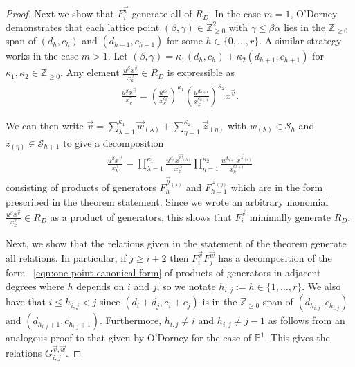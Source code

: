 \documentclass{amsart}
\theoremstyle{plain}
\theoremstyle{definition}
\theoremstyle{remark}
\numberwithin{equation}{section}
\newcommand\bp{{\mathbb P}}
\newcommand\bz{{\mathbb Z}}
\newcommand\mss{\mathscr{S}}
\begin{document}
\begin{proof}
Next we show that $F^{\vec v}_i$ generate all of $R_D$. In the case $m = 1$, O'Dorney \cite[Theorem 6]
{dorney:canonical} demonstrates that each lattice point $(\beta, \gamma) \in
\bz_{\geq 0}^2$ with $\gamma \leq \beta \alpha$ lies in the $\bz_{\geq 0}$ span
of $(d_h, c_h)$ and $(d_{h + 1}, c_{h + 1})$ for
some $h \in \{0, \ldots, r\}$. A similar strategy works in the case $m > 1$. Let $(\beta, \gamma) = \kappa_1
(d_h, c_h) + \kappa_2 (d_{h + 1}, c_{h + 1})$ for $\kappa_1, \kappa_2 \in
\bz_{\geq 0}$. Any element $\frac{u^{\beta}
x^{\vec{v}}} {x_k^{ \gamma}} \in R_D$ is expressible as
\begin{align*}
	\frac{u^{\beta} x^{\vec{v}}} {x_k^{\gamma}} = \left(\frac{u^{d_h}}
	{x_k^{c_h}}\right)^{\kappa_1} \left(\frac{u^{d_{h + 1}}}
	{x_k^{c_{h + 1}}}\right)^{\kappa_2} x^{\vec{v}}.
\end{align*}

\noindent
We can then write $\vec{v}  = \sum_{\lambda=1}^{\kappa_1}\vec{w}_{(\lambda)} +
\sum_{\eta=1}^{\kappa_2} \vec z_{(\eta)}$ with $w_{(\lambda)} \in \mss_h$ and
$z_{(\eta)} \in \mss_{h+1}$ to give a decomposition
\begin{align}
\label{eqn:one-point-canonical-form}
	\frac{u^{\beta} x^{\vec{v}}} {x_k^{\gamma}}	= \prod_{\lambda = 1}
	^{\kappa_1} \frac{u^{d_h} x^{\vec{w}_{(\lambda)}}} {x_k^{c_h}}
	\prod_{\eta = 1}^{\kappa_2} \frac{u^{d_{h + 1}} x^{\vec{z}_{(\eta)}}}
	{x_k^{c_{h + 1}}}
\end{align}
\noindent
consisting of products of generators $F_h^{\vec{y}_{(\lambda)}}$
and $F_{h + 1}^{\vec{z}_{(\eta)}}$ which are in the form
prescribed in the theorem statement. Since we wrote an arbitrary monomial
$\frac{u^{\beta} x^{\vec{v}}}{x_k^\gamma} \in R_D$ as a product of generators,
this shows that $F_i^{\vec v}$ minimally generate $R_D$.

Next, we show that the relations given in the statement of the theorem generate all relations. 
In particular, if $j \geq i + 2$ then $F_i^{\vec{v}} F_j^{\vec{w}}$
has a decomposition of the form ~\eqref{eqn:one-point-canonical-form} of 
products of generators in adjacent degrees where $h$
depends on $i$ and $ j$, so we notate $h_{i, j} := h \in \{1, \ldots, r\}$. We 
also have that $i \leq h_{i, j} < j$ since $(d_i + d_j, c_i + c_j)$ is in the
$\bz_{\geq 0}$-span of $(d_{h_{i, j}}, c_{h_{i, j}})$ and
$(d_{h_{i, j} + 1}, c_{h_{i, j} + 1})$. Furthermore,
$h_{i, j} \neq i$ and $h_{i, j} \neq j - 1$
as follows from an analogous proof to that given by O'Dorney
\cite[Theorem 6]{dorney:canonical} for the case of
$\bp^1$. This gives the relations
$G_{i, j}^{\vec{v}, \vec{w}}$.


\end{proof}
\end{document}
